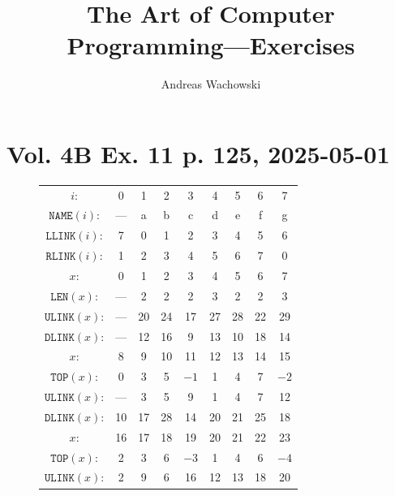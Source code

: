 \documentclass[a4paper,landscape,11pt]{article}
\title{The Art of Computer Programming---Exercises}
\author{Andreas Wachowski}
\date{}
\begin{document}
\maketitle

\thispagestyle{empty}
\tableofcontents
\listoffigures
\listoftables
\newpage
{}

\section{Vol. 4B Ex. 11 p. 125, 2025-05-01}

\begin{figure}[H]
	\centering

	\begin{minipage}[t]{0.48\linewidth}
		\centering
		\begin{tabular}{c c c c c c c c c}
			\hline
			$i$:                 & 0   & 1  & 2    & 3    & 4  & 5  & 6    & 7    \\
			$\texttt{NAME}(i)$:  & --- & a  & b    & c    & d  & e  & f    & g    \\
			$\texttt{LLINK}(i)$: & 7   & 0  & 1    & 2    & 3  & 4  & 5    & 6    \\
			$\texttt{RLINK}(i)$: & 1   & 2  & 3    & 4    & 5  & 6  & 7    & 0    \\
			\hline
			$x$:                 & 0   & 1  & 2    & 3    & 4  & 5  & 6    & 7    \\
			$\texttt{LEN}(x)$:   & --- & 2  & 2    & 2    & 3  & 2  & 2    & 3    \\
			$\texttt{ULINK}(x)$: & --- & 20 & 24   & 17   & 27 & 28 & 22   & 29   \\
			$\texttt{DLINK}(x)$: & --- & 12 & 16   & 9    & 13 & 10 & 18   & 14   \\
			\hline
			$x$:                 & 8   & 9  & 10   & 11   & 12 & 13 & 14   & 15   \\
			$\texttt{TOP}(x)$:   & 0   & 3  & 5    & $-1$ & 1  & 4  & 7    & $-2$ \\
			$\texttt{ULINK}(x)$: & --- & 3  & 5    & 9    & 1  & 4  & 7    & 12   \\
			$\texttt{DLINK}(x)$: & 10  & 17 & 28   & 14   & 20 & 21 & 25   & 18   \\
			\hline
			$x$:                 & 16  & 17 & 18   & 19   & 20 & 21 & 22   & 23   \\
			$\texttt{TOP}(x)$:   & 2   & 3  & 6    & $-3$ & 1  & 4  & 6    & $-4$ \\
			$\texttt{ULINK}(x)$: & 2   & 9  & 6    & 16   & 12 & 13 & 18   & 20   \\

\end{tabular}
\end{minipage}
\end{figure}
\end{document}
